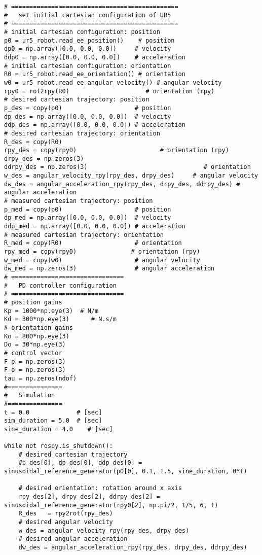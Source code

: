 \begin{lstlisting}
# ==============================================
#   set initial cartesian configuration of UR5
# ==============================================
# initial cartesian configuration: position
p0 = ur5_robot.read_ee_position()    # position
dp0 = np.array([0.0, 0.0, 0.0])     # velocity
ddp0 = np.array([0.0, 0.0, 0.0])    # acceleration
# initial cartesian configuration: orientation
R0 = ur5_robot.read_ee_orientation() # orientation
w0 = ur5_robot.read_ee_angular_velocity() # angular velocity
rpy0 = rot2rpy(R0)                     # orientation (rpy)
# desired cartesian trajectory: position
p_des = copy(p0)                    # position
dp_des = np.array([0.0, 0.0, 0.0])  # velocity
ddp_des = np.array([0.0, 0.0, 0.0]) # acceleration
# desired cartesian trajectory: orientation
R_des = copy(R0)
rpy_des = copy(rpy0)                       # orientation (rpy)
drpy_des = np.zeros(3)
ddrpy_des = np.zeros(3)                                # orientation
w_des = angular_velocity_rpy(rpy_des, drpy_des)     # angular velocity
dw_des = angular_acceleration_rpy(rpy_des, drpy_des, ddrpy_des) # angular acceleration
# measured cartesian trajectory: position
p_med = copy(p0)                    # position
dp_med = np.array([0.0, 0.0, 0.0])  # velocity
ddp_med = np.array([0.0, 0.0, 0.0]) # acceleration
# measured cartesian trajectory: orientation
R_med = copy(R0)                    # orientation
rpy_med = copy(rpy0)               # orientation (rpy)
w_med = copy(w0)                    # angular velocity
dw_med = np.zeros(3)                # angular acceleration
# ===============================
#   PD controller configuration
# ===============================
# position gains
Kp = 1000*np.eye(3)  # N/m
Kd = 300*np.eye(3)      # N.s/m
# orientation gains
Ko = 800*np.eye(3)   
Do = 30*np.eye(3)
# control vector
F_p = np.zeros(3)    
F_o = np.zeros(3)
tau = np.zeros(ndof)
#===============
#   Simulation
#===============
t = 0.0             # [sec] 
sim_duration = 5.0  # [sec]
sine_duration = 4.0    # [sec]

while not rospy.is_shutdown():
    # desired cartesian trajectory
    #p_des[0], dp_des[0], ddp_des[0] = sinusoidal_reference_generator(p0[0], 0.1, 1.5, sine_duration, 0*t)
    
    # desired orientation: rotation around x axis
    rpy_des[2], drpy_des[2], ddrpy_des[2] = sinusoidal_reference_generator(rpy0[2], np.pi/2, 1/5, 6, t)     
    R_des   = rpy2rot(rpy_des)
    # desired angular velocity
    w_des = angular_velocity_rpy(rpy_des, drpy_des)
    # desired angular acceleration
    dw_des = angular_acceleration_rpy(rpy_des, drpy_des, ddrpy_des)
    

\end{lstlisting}
